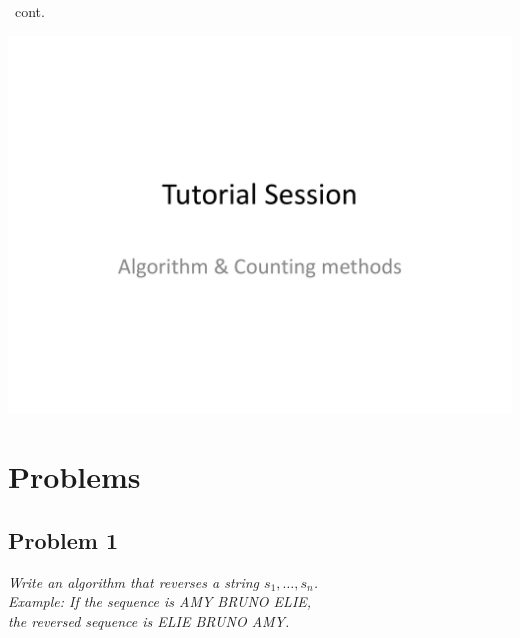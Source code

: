 \documentclass{beamer}
\begin{document}
    \begin{frame}[c,shrink]{\secname\ cont.}
        \centerline{\includegraphics[height=0.85\textheight,page=6]{algo_counting}}
    \end{frame}
    
    
    
\section{Problems}



    \subsection{Problem 1}
    
        \begin{frame}[c]{\subsecname}
            \textit{Write an algorithm that reverses a string $s_1,\ldots,s_n$.\\
            Example: If the sequence is AMY BRUNO ELIE,\\
            the reversed sequence is ELIE BRUNO AMY.}            
        \end{frame}
        
\end{document}
